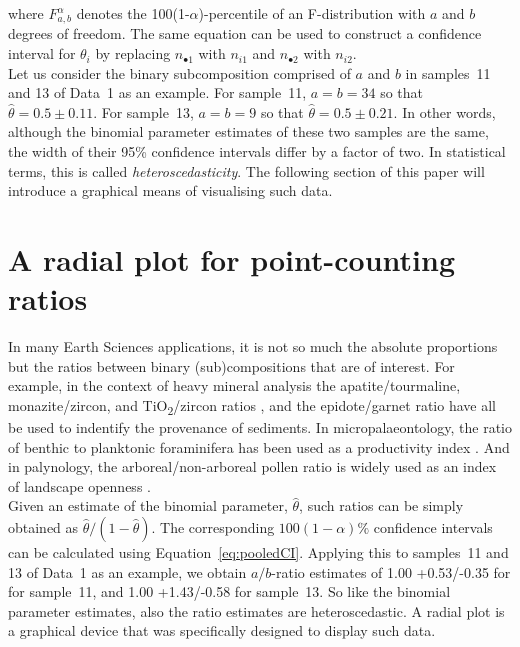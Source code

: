 \documentclass{article}
\begin{document}
\noindent where $F^{\alpha}_{a,b}$ denotes the
100(1-$\alpha$)-percentile of an F-distribution with $a$ and $b$
degrees of freedom. The same equation can be used to construct a
confidence interval for $\theta_i$ by replacing $n_{\bullet 1}$ with
$n_{i1}$ and $n_{\bullet 2}$ with $n_{i2}$.\\

Let us consider the binary subcomposition comprised of $a$ and $b$ in
samples~11 and 13 of Data~1 as an example. For sample~11, $a = b = 34$
so that $\hat{\theta} = 0.5 \pm 0.11$.  For sample~13, $a = b = 9$ so
that $\hat{\theta} = 0.5 \pm 0.21$.  In other words, although the
binomial parameter estimates of these two samples are the same, the
width of their 95\% confidence intervals differ by a factor of two. In
statistical terms, this is called \emph{heteroscedasticity}. The
following section of this paper will introduce a graphical means of
visualising such data.

\section{A radial plot for point-counting ratios}
\label{sec:radial}

In many Earth Sciences applications, it is not so much the absolute
proportions but the ratios between binary (sub)compositions that are
of interest. For example, in the context of heavy mineral analysis the
apatite/tourmaline, monazite/zircon, and TiO\textsubscript{2}/zircon
ratios \citep[e.g.,][]{morton1994}, and the epidote/garnet ratio
\citep{heroy2003} have all be used to indentify the provenance of
sediments. In micropalaeontology, the ratio of benthic to planktonic
foraminifera has been used as a productivity index
\citep[e.g.,][]{berger1988}. And in palynology, the
arboreal/non-arboreal pollen ratio is widely used as an index of
landscape openness \citep[e.g.,][]{herzschuh2007}.\\

Given an estimate of the binomial parameter, $\hat{\theta}$, such
ratios can be simply obtained as $\hat{\theta}/(1-\hat{\theta})$.  The
corresponding $100(1-\alpha)\%$ confidence intervals can be calculated
using Equation~\ref{eq:pooledCI}. Applying this to samples~11 and 13
of Data~1 as an example, we obtain $a/b$-ratio estimates of 1.00
+0.53/-0.35 for for sample~11, and 1.00 +1.43/-0.58 for sample~13.  So
like the binomial parameter estimates, also the ratio estimates are
heteroscedastic. A radial plot is a graphical device that was
specifically designed to display such data.\\
\end{document}
